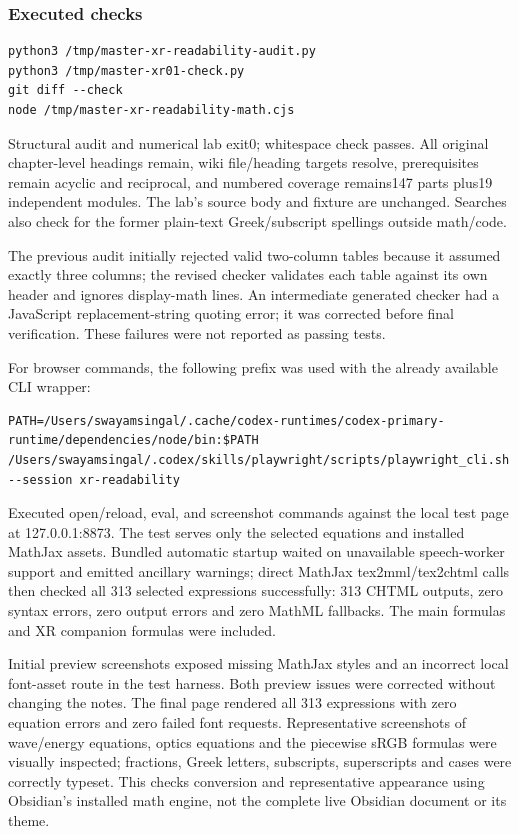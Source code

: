 \subsubsection{Executed checks}\label{appendix-a103e7846d21-executed-checks}

\begin{verbatim}
python3 /tmp/master-xr-readability-audit.py
python3 /tmp/master-xr01-check.py
git diff --check
node /tmp/master-xr-readability-math.cjs
\end{verbatim}

Structural audit and numerical lab exit0; whitespace check passes. All original chapter-level headings remain, wiki file/heading targets resolve, prerequisites remain acyclic and reciprocal, and numbered coverage remains147 parts plus19 independent modules. The lab's source body and fixture are unchanged. Searches also check for the former plain-text Greek/subscript spellings outside math/code.

The previous audit initially rejected valid two-column tables because it assumed exactly three columns; the revised checker validates each table against its own header and ignores display-math lines. An intermediate generated checker had a JavaScript replacement-string quoting error; it was corrected before final verification. These failures were not reported as passing tests.

For browser commands, the following prefix was used with the already available CLI wrapper:

\begin{verbatim}
PATH=/Users/swayamsingal/.cache/codex-runtimes/codex-primary-runtime/dependencies/node/bin:$PATH /Users/swayamsingal/.codex/skills/playwright/scripts/playwright_cli.sh --session xr-readability
\end{verbatim}

Executed open/reload, eval, and screenshot commands against the local test page at 127.0.0.1:8873. The test serves only the selected equations and installed MathJax assets. Bundled automatic startup waited on unavailable speech-worker support and emitted ancillary warnings; direct MathJax tex2mml/tex2chtml calls then checked all 313 selected expressions successfully: 313 CHTML outputs, zero syntax errors, zero output errors and zero MathML fallbacks. The main formulas and XR companion formulas were included.

Initial preview screenshots exposed missing MathJax styles and an incorrect local font-asset route in the test harness. Both preview issues were corrected without changing the notes. The final page rendered all 313 expressions with zero equation errors and zero failed font requests. Representative screenshots of wave/energy equations, optics equations and the piecewise sRGB formulas were visually inspected; fractions, Greek letters, subscripts, superscripts and cases were correctly typeset. This checks conversion and representative appearance using Obsidian's installed math engine, not the complete live Obsidian document or its theme.


